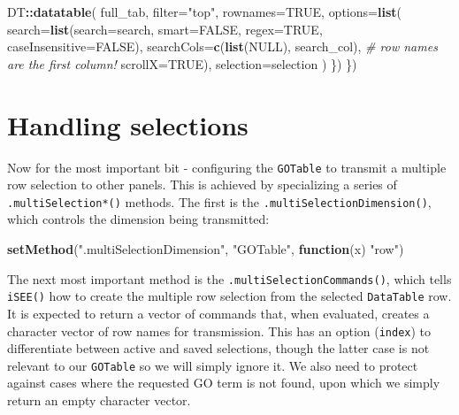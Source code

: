 \documentclass[
]{book}
\newenvironment{Shaded}{\begin{snugshade}}{\end{snugshade}}
\newcommand{\CommentTok}[1]{\textcolor[rgb]{0.56,0.35,0.01}{\textit{#1}}}
\newcommand{\ControlFlowTok}[1]{\textcolor[rgb]{0.13,0.29,0.53}{\textbf{#1}}}
\newcommand{\DataTypeTok}[1]{\textcolor[rgb]{0.13,0.29,0.53}{#1}}
\newcommand{\KeywordTok}[1]{\textcolor[rgb]{0.13,0.29,0.53}{\textbf{#1}}}
\newcommand{\NormalTok}[1]{#1}
\newcommand{\OperatorTok}[1]{\textcolor[rgb]{0.81,0.36,0.00}{\textbf{#1}}}
\newcommand{\OtherTok}[1]{\textcolor[rgb]{0.56,0.35,0.01}{#1}}
\newcommand{\StringTok}[1]{\textcolor[rgb]{0.31,0.60,0.02}{#1}}
\begin{document}
\begin{Shaded}
\begin{Highlighting}[]
\NormalTok{        DT}\OperatorTok{::}\KeywordTok{datatable}\NormalTok{(}
\NormalTok{            full_tab, }\DataTypeTok{filter=}\StringTok{"top"}\NormalTok{, }\DataTypeTok{rownames=}\OtherTok{TRUE}\NormalTok{,}
            \DataTypeTok{options=}\KeywordTok{list}\NormalTok{(}
                \DataTypeTok{search=}\KeywordTok{list}\NormalTok{(}\DataTypeTok{search=}\NormalTok{search, }\DataTypeTok{smart=}\OtherTok{FALSE}\NormalTok{, }\DataTypeTok{regex=}\OtherTok{TRUE}\NormalTok{, }\DataTypeTok{caseInsensitive=}\OtherTok{FALSE}\NormalTok{),}
                \DataTypeTok{searchCols=}\KeywordTok{c}\NormalTok{(}\KeywordTok{list}\NormalTok{(}\OtherTok{NULL}\NormalTok{), search_col), }\CommentTok{# row names are the first column!}
                \DataTypeTok{scrollX=}\OtherTok{TRUE}\NormalTok{),}
            \DataTypeTok{selection=}\NormalTok{selection}
\NormalTok{        )}
\NormalTok{    \})}
\NormalTok{\})}
\end{Highlighting}
\end{Shaded}

\hypertarget{handling-selections}{%
\section{Handling selections}\label{handling-selections}}

Now for the most important bit - configuring the \texttt{GOTable} to transmit a multiple row selection to other panels.
This is achieved by specializing a series of \texttt{.multiSelection*()} methods.
The first is the \texttt{.multiSelectionDimension()}, which controls the dimension being transmitted:

\begin{Shaded}
\begin{Highlighting}[]
\KeywordTok{setMethod}\NormalTok{(}\StringTok{".multiSelectionDimension"}\NormalTok{, }\StringTok{"GOTable"}\NormalTok{, }\ControlFlowTok{function}\NormalTok{(x) }\StringTok{"row"}\NormalTok{)}
\end{Highlighting}
\end{Shaded}

The next most important method is the \texttt{.multiSelectionCommands()}, which tells \texttt{iSEE()} how to create the multiple row selection from the selected \texttt{DataTable} row.
It is expected to return a vector of commands that, when evaluated, creates a character vector of row names for transmission.
This has an option (\texttt{index}) to differentiate between active and saved selections, though the latter case is not relevant to our \texttt{GOTable} so we will simply ignore it.
We also need to protect against cases where the requested GO term is not found, upon which we simply return an empty character vector.
\end{document}

